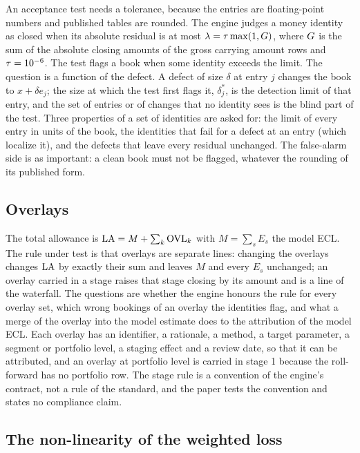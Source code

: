 An acceptance test needs a tolerance, because the entries are floating-point numbers and published tables are rounded.
The engine judges a money identity as closed when its absolute residual is at most $\lambda=\tau\max(1,G)$, where $G$ is the sum of the absolute closing amounts of the gross carrying amount rows and $\tau=10^{-6}$.
The test flags a book when some identity exceeds the limit.
The question is a function of the defect.
A defect of size $\delta$ at entry $j$ changes the book to $x+\delta e_j$; the size at which the test first flags it, $\delta^{*}_{j}$, is the detection limit of that entry, and the set of entries or of changes that no identity sees is the blind part of the test.
Three properties of a set of identities are asked for: the limit of every entry in units of the book, the identities that fail for a defect at an entry (which localize it), and the defects that leave every residual unchanged.
The false-alarm side is as important: a clean book must not be flagged, whatever the rounding of its published form.

\subsection{Overlays}
\label{sec:problem-overlays}

The total allowance is $\mathrm{LA}=M+\sum_k\mathrm{OVL}_k$ with $M=\sum_s E_s$ the model ECL.
The rule under test is that overlays are separate lines: changing the overlays changes $\mathrm{LA}$ by exactly their sum and leaves $M$ and every $E_s$ unchanged; an overlay carried in a stage raises that stage closing by its amount and is a line of the waterfall.
The questions are whether the engine honours the rule for every overlay set, which wrong bookings of an overlay the identities flag, and what a merge of the overlay into the model estimate does to the attribution of the model ECL.
Each overlay has an identifier, a rationale, a method, a target parameter, a segment or portfolio level, a staging effect and a review date, so that it can be attributed, and an overlay at portfolio level is carried in stage 1 because the roll-forward has no portfolio row.
The stage rule is a convention of the engine's contract, not a rule of the standard, and the paper tests the convention and states no compliance claim.

\subsection{The non-linearity of the weighted loss}
\label{sec:problem-nonlinearity}


